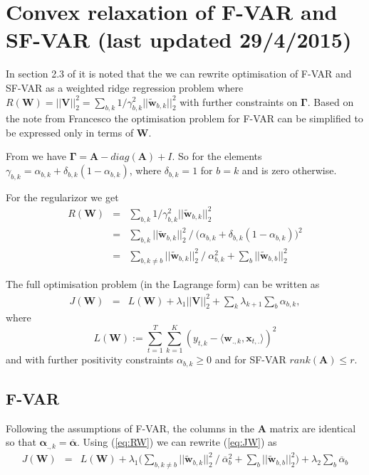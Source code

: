 \documentclass[a4paper]{article}
\newcommand{\vc}[1]{\mathbf{#1}}
\begin{document}
\section{Convex relaxation of F-VAR and SF-VAR (last updated 29/4/2015)}
In section 2.3 of \cite{Gregorova2015} it is noted that the we can rewrite optimisation of F-VAR and SF-VAR as a weighted ridge regression problem where $\mathit{R}(\vc{W}) = ||\vc{V}||_2^2 = \sum_{b,k} 1/\gamma_{b,k}^2 ||\tilde{\vc{w}}_{b,k}||_2^2$ with further constraints on $\vc{\Gamma}$.
Based on the note from Francesco \cite{Dinuzzo2015} the optimisation problem for F-VAR can be simplified to be expressed only in terms of $\vc{W}$.

From \cite{Gregorova2015} we have $\vc{\Gamma} = \vc{A} - diag(\vc{A}) + I$.
So for the elements $\gamma_{b,k} = \alpha_{b,k} + \delta_{b,k}(1 - \alpha_{b,k})$, where $\delta_{b,k} = 1$ for $b=k$ and is zero otherwise.

For the regularizor we get 
\begin{eqnarray}\label{eq:RW}
\mathit{R}(\vc{W}) & = & \sum_{b,k} 1/\gamma_{b,k}^2 ||\tilde{\vc{w}}_{b,k}||_2^2 \nonumber \\
& = & \sum_{b,k} ||\tilde{\vc{w}}_{b,k}||_2^2 ~/~ \big(\alpha_{b,k} + \delta_{b,k}(1 - \alpha_{b,k})\big)^2  \nonumber \\
& = & \sum_{b,k \neq b} ||\tilde{\vc{w}}_{b,k}||_2^2 ~/~ \alpha_{b,k}^2 + \sum_b ||\tilde{\vc{w}}_{b,b}||_2^2
\end{eqnarray}

The full optimisation problem (in the Lagrange form) can be written as
\begin{eqnarray}\label{eq:JW}
\mathit{J}(\vc{W}) & = & \mathit{L}(\vc{W}) + \lambda_{1} ||\vc{V}||_2^2 + \sum_k \lambda_{k+1} \sum_b \alpha_{b,k}, \end{eqnarray}
where 
\begin{equation}\label{eq:LW}
\mathit{L}(\vc{W}):= \sum_{t=1}^T \sum_{k=1}^K (y_{t,k} - \langle \vc{w}_{.,k},\vc{x}_{t,.} \rangle )^2
\end{equation} 
and with further positivity constraints $\alpha_{b,k} \geq 0$ and for SF-VAR $rank(\vc{A}) \leq r$.

\subsection{F-VAR}\label{sec:F-VARsimple}
Following the assumptions of F-VAR, the columns in the $\vc{A}$ matrix are identical so that $\vc{\alpha}_{.,k} = {\overline{\vc{\alpha}}}$.
Using (\ref{eq:RW}) we can rewrite (\ref{eq:JW}) as
\begin{eqnarray}\label{eq:JWFVAR}
\mathit{J}(\vc{W}) & = & \mathit{L}(\vc{W}) + \lambda_1 \Big( \sum_{b,k \neq b} ||\tilde{\vc{w}}_{b,k}||_2^2 ~/~ \overline{\alpha}_{b}^2 + \sum_b ||\tilde{\vc{w}}_{b,b}||_2^2 \Big) + \lambda_2 \sum_b \overline{\alpha}_{b}
\end{eqnarray}
\end{document}
